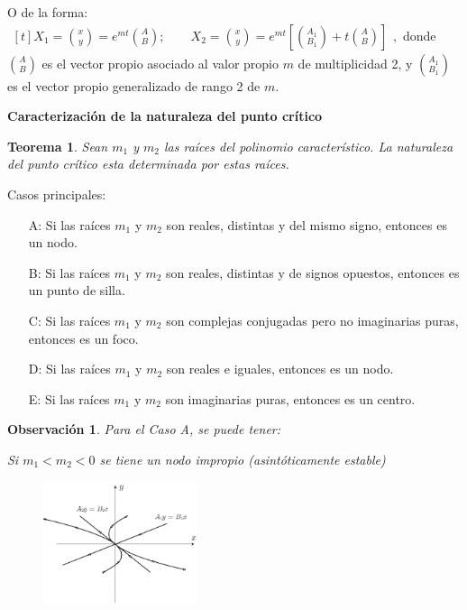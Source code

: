 \documentclass[a5paper,doc,10pt,noapacite]{apa6}
\newtheorem{teorema}{Teorema}
\newtheorem{observ}{Observación}
\newcommand{\neodefi}[1]{%
	\vspace{1\baselineskip}
	\textbf{\small#1} \newline
}
\begin{document}
{{\begin{APAenumerate}
	\vspace{1\baselineskip}
	\item O de la forma:
	\( \begin{aligned}[t]
	X_1 = \binom{x}{y}
		= e^{m t } \binom{A}{B}
	;
	\qquad
	X_2 = \binom{x}{y}
		= e^{m t } \left[ \binom{A_1}{B_1} + t \binom{A}{B} \right]
	\end{aligned},
	\)
	donde \(\binom{A}{B}\) es el vector propio asociado al valor propio \(m\) de multiplicidad 2, y  \(\binom{A_1}{B_1}\) es el vector propio generalizado de rango 2 de \(m\).
\end{APAenumerate}

%
\neodefi{Caracterización de la naturaleza del punto crítico}

\begin{teorema}\label{teo-1}
	Sean \(m_1\) y \(m_2\) las raíces del polinomio característico. La naturaleza del punto crítico esta determinada por estas raíces.
\end{teorema}

Casos principales:
\begin{itemize}[leftmargin=15pt]
	\item[A:] Si las raíces \(m_1\) y \(m_2\) son reales, distintas y del mismo signo, entonces es un nodo.
	\item[B:] Si las raíces \(m_1\) y \(m_2\) son reales, distintas y de signos opuestos, entonces es un punto de silla.
	\item[C:] Si las raíces \(m_1\) y \(m_2\) son complejas conjugadas pero no imaginarias puras, entonces es un foco.
	\item[D:] Si las raíces \(m_1\) y \(m_2\) son reales e iguales, entonces es un nodo.
	\item[E:] Si las raíces \(m_1\) y \(m_2\) son imaginarias puras, entonces es un centro.
\end{itemize}

\newpage

\begin{observ}
	Para el Caso A, se puede tener:
	
	Si \(m_1<m_2<0\) se tiene un nodo impropio (asintóticamente estable)
	\vspace{-1\baselineskip}
	\begin{figure}[H]
		\captionsetup{justification=centering, labelfont=footnotesize, font=footnotesize}
		\centering
		\includegraphics[width=4.5cm]{Graficos/figura11}
	

\end{figure}
\end{observ}}}
\end{document}

